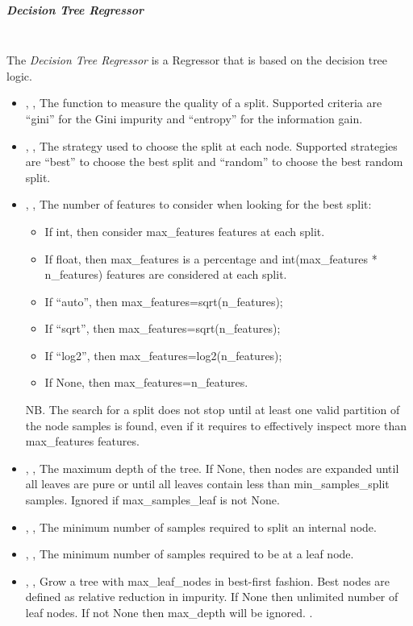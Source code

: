 \subparagraph{Decision Tree Regressor}
\mbox{}
\\The \textit{Decision Tree Regressor} is a Regressor that is based on the
decision tree logic.
%
\begin{itemize}
  \item {}, ,
  The function to measure the quality of a split.
  Supported criteria are ``gini'' for the Gini impurity and ``entropy'' for the
  information gain.
  \item {}, ,
  The strategy used to choose the split at each node.
  Supported strategies are ``best'' to choose the best split and ``random'' to
  choose the best random split.
  \item {}, ,
  The number of features to consider when looking for the best split:
\begin{itemize}
    \item If int, then consider max\_features features at each split.
    \item If float, then max\_features is a percentage and int(max\_features *
    n\_features) features are considered at each split.
    \item If “auto”, then max\_features=sqrt(n\_features);
    \item If “sqrt”, then max\_features=sqrt(n\_features);
    \item If “log2”, then max\_features=log2(n\_features);
    \item If None, then max\_features=n\_features.
\end{itemize}
  NB.
  The search for a split does not stop until at least one valid partition of the
  node samples is found, even if it requires to effectively inspect more than
  max\_features features.
  \\
  \item {}, ,
  The maximum depth of the tree.
  If None, then nodes are expanded until all leaves are pure or until all leaves
  contain less than min\_samples\_split samples.
  Ignored if max\_samples\_leaf is not None.
  \item {}, ,
  The minimum number of samples required to split an internal node.
  \item {}, ,
  The minimum number of samples required to be at a leaf node.
  \item {}, ,
  Grow a tree with max\_leaf\_nodes in best-first fashion.
  Best nodes are defined as relative reduction in impurity.
  If None then unlimited number of leaf nodes.
  If not None then max\_depth will be ignored.
  .
\end{itemize}
